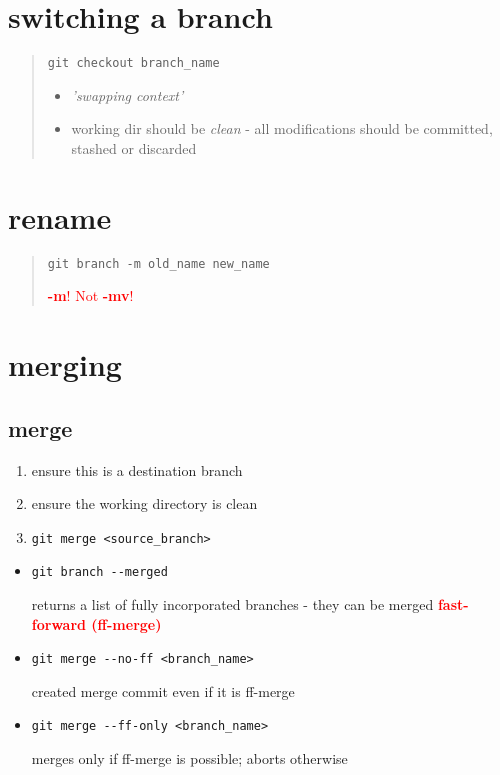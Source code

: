 \documentclass{report}
\begin{document}
\section{switching a branch}
\begin{quote}
\begin{verbatim}
git checkout branch_name
\end{verbatim}
\begin{itemize}
\item \textit{'swapping context'}
\item working dir should be \textit{clean} - all modifications should be committed, stashed or discarded
\end{itemize}
\end{quote}

\section{rename}
\begin{quote}
\begin{verbatim}
git branch -m old_name new_name
\end{verbatim}
\textcolor{red}{\textbf{-m}! Not \textbf{-mv}!}
\end{quote}

\section{merging}
\subsection{merge}

\begin{enumerate}
\item ensure this is a destination branch
\item ensure the working directory is clean
\item \begin{verbatim}
git merge <source_branch>
\end{verbatim}
\end{enumerate}

\begin{itemize}
\item 
\begin{verbatim}
git branch --merged
\end{verbatim}
returns a list of fully incorporated branches - they can be merged \textcolor{red}{\textbf{fast-forward (ff-merge)}}

\item \begin{verbatim}
git merge --no-ff <branch_name>
\end{verbatim}
created merge commit even if it is ff-merge

\item \begin{verbatim}
git merge --ff-only <branch_name>
\end{verbatim}
merges only if ff-merge is possible; aborts otherwise

\end{itemize}
\end{document}
